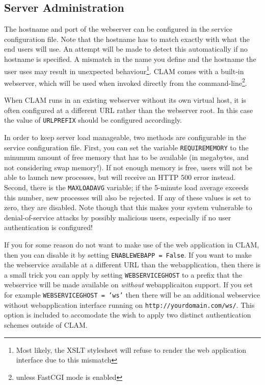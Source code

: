 \documentclass[a4paper,12pt]{report}
\begin{document}
\subsection{Server Administration}
\label{sec:sadmin}

The hostname and port of the webserver can be configured in the service configuration file. Note that the hostname has to match exactly with what the end users will use. An attempt will be made to detect this automatically if no hostname is specified. A mismatch in the name you define and the hostname the user uses may result in unexpected behaviour\footnote{Most likely, the XSLT stylesheet will refuse to render the web application interface due to this mismatch}. CLAM comes with a built-in webserver, which will be used when invoked directly from the command-line\footnote{unless FastCGI mode is enabled}.

When CLAM runs in an existing webserver without its own virtual host, it is often configured at a different URL rather than the webserver root. In this case the value of \texttt{URLPREFIX} should be configured accordingly.

In order to keep server load manageable, two methods are configurable in the service configuration file. First, you can set the variable \texttt{REQUIREMEMORY} to the minumum amount of free memory that has to be available (in megabytes, and not considering swap memory!). If not enough memory is free, users will not be able to launch new processes, but will receive an HTTP 500 error instead. Second, there is the \texttt{MAXLOADAVG} variable; if the 5-minute load average exceeds this number, new processes will also be rejected. If any of these values is set to zero, they are disabled. Note though that this makes your system vulnerable to denial-of-service attacks by possibly malicious users, especially if no user authentication is configured!

If you for some reason do not want to make use of the web application in CLAM, then you can disable it by setting \texttt{ENABLEWEBAPP = False}. If you want to make the webservice available at a different URL than the webapplication, then there is a small trick you can apply by setting \texttt{WEBSERVICEGHOST} to a prefix that the webservice will be made available on \emph{without} webapplicaiton support. If you set for example \texttt{WEBSERVICEGHOST = 'ws'} then there will be an additional webservice without webapplication interface running on \texttt{http://yourdomain.com/ws/}. This option is included to accomodate the wish to apply two distinct authentication schemes outside of CLAM. 
\end{document}
